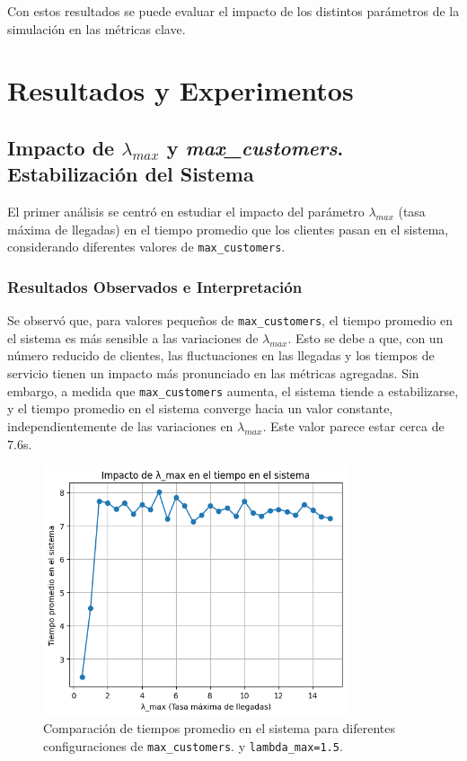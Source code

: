 \documentclass[12pt]{article}
\begin{document}
Con estos resultados se puede evaluar el impacto de los distintos parámetros de la simulación en las métricas clave.

\section{Resultados y Experimentos}
\subsection{Impacto de \texorpdfstring{$\lambda_{max}$}{lambda\_max} y \texorpdfstring{\textit{max\_customers}}{max\_customers}. Estabilización del Sistema}

El primer análisis se centró en estudiar el impacto del parámetro $\lambda_{max}$ (tasa máxima de llegadas) en el tiempo promedio que los clientes pasan en el sistema, considerando diferentes valores de \texttt{max\_customers}.

\subsubsection{Resultados Observados e Interpretación}
Se observó que, para valores pequeños de \texttt{max\_customers}, el tiempo promedio en el sistema es más sensible a las variaciones de $\lambda_{max}$. Esto se debe a que, con un número reducido de clientes, las fluctuaciones en las llegadas y los tiempos de servicio tienen un impacto más pronunciado en las métricas agregadas. Sin embargo, a medida que \texttt{max\_customers} aumenta, el sistema tiende a estabilizarse, y el tiempo promedio en el sistema converge hacia un valor constante, independientemente de las variaciones en $\lambda_{max}$. Este valor parece estar cerca de 7.6s.

\begin{figure}[H]
    \centering
    \includegraphics[width=0.8\textwidth]{results1.0.png}
    \caption{Comparación de tiempos promedio en el sistema para diferentes configuraciones de \texttt{max\_customers}. y \texttt{lambda\_max=1.5}.}
    \label{fig:results1.0}
\end{figure}
\end{document}
